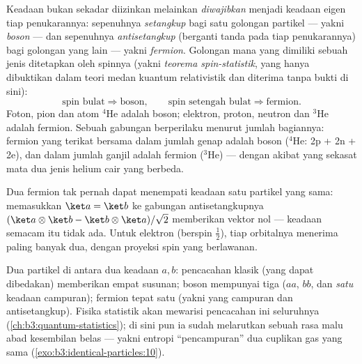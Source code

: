 \begin{theorem}\label{thm:b3:identical-particles:postulate}
Keadaan  bukan sekadar diizinkan melainkan
\emph{diwajibkan} menjadi keadaan eigen tiap penukarannya: sepenuhnya
\emph{setangkup} bagi satu golongan partikel --- yakni \emph{boson} ---
dan sepenuhnya \emph{antisetangkup} (berganti tanda pada tiap
penukarannya) bagi golongan yang lain --- yakni \emph{fermion}.
Golongan mana yang dimiliki sebuah jenis ditetapkan oleh spinnya (yakni
\emph{teorema spin-statistik}, yang hanya dibuktikan dalam teori medan
kuantum relativistik dan diterima tanpa bukti di sini):
\[
\text{spin bulat} \Rightarrow \text{boson} , \qquad
\text{spin setengah bulat} \Rightarrow \text{fermion} .
\]
Foton, pion dan atom $^4$He adalah boson; elektron, proton,
neutron dan $^3$He adalah fermion.
Sebuah gabungan berperilaku menurut jumlah bagiannya: fermion yang
terikat bersama dalam jumlah genap adalah boson ($^4$He: 2p + 2n + 2e),
dan dalam jumlah ganjil adalah fermion ($^3$He) --- dengan akibat yang
sekasat mata dua jenis helium cair yang berbeda.
\end{theorem}
\admitted

\begin{corollary}\label{cor:b3:identical-particles:pauli}
Dua fermion tak pernah dapat menempati keadaan satu partikel yang sama:
memasukkan $\ket a = \ket b$ ke gabungan antisetangkupnya
$(\ket a\otimes\ket b - \ket b\otimes\ket a)/\sqrt2$ memberikan vektor
nol --- keadaan semacam itu tidak ada. Untuk elektron (berspin
$\tfrac12$), tiap orbitalnya menerima paling banyak dua, dengan proyeksi
spin yang berlawanan.
\end{corollary}

\begin{example}\label{ex:b3:identical-particles:counting}
Dua partikel di antara dua keadaan $a, b$: pencacahan klasik (yang dapat
dibedakan) memberikan empat susunan; boson mempunyai tiga ($aa$, $bb$,
dan \emph{satu} keadaan campuran); fermion tepat satu (yakni yang
campuran dan antisetangkup). Fisika statistik akan mewarisi pencacahan
ini seluruhnya (\cref{ch:b3:quantum-statistics}); di sini pun ia sudah
melarutkan sebuah rasa malu abad kesembilan belas --- yakni entropi
``pencampuran'' dua cuplikan gas yang sama
(\cref{exo:b3:identical-particles:10}).
\end{example}

